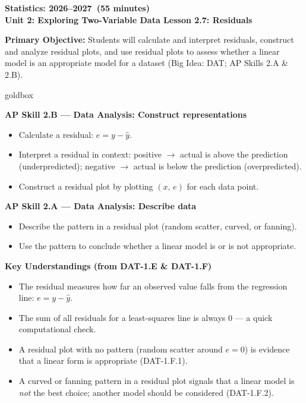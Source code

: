 \documentclass[10pt]{article}
\newcommand{\CourseName}{Statistics}
\newcommand{\SchoolYear}{2026--2027}
\newcommand{\MeetingLength}{55 minutes}
\newcommand{\UnitNumberName}{Unit 2: Exploring Two-Variable Data \quad}
\newcommand{\LessonNumberName}{Lesson 2.7: Residuals}
\begin{document}
\begin{center}
    {\Large\bfseries \CourseName: \SchoolYear\ (\MeetingLength) \\
    {\small\bfseries \UnitNumberName \LessonNumberName}}
\end{center}

\begin{tcolorbox}[colback=sky,colframe=navy,boxrule=0.9pt,arc=2mm,
    left=2mm,right=2mm,top=1.5mm,bottom=1.5mm]
    \textbf{Primary Objective:} Students will calculate and interpret residuals, construct and
    analyze residual plots, and use residual plots to assess whether a linear model is an
    appropriate model for a dataset (Big Idea: DAT; AP Skills 2.A \& 2.B).
\end{tcolorbox}

\begin{skillbox}{goldbox}
\begin{minipage}[t]{0.48\linewidth}
    \textbf{AP Skill 2.B --- Data Analysis: Construct representations}
    \begin{itemize}
        \item Calculate a residual: $e = y - \hat{y}$.
        \item Interpret a residual in context: positive $\to$ actual is above the prediction
              (underpredicted); negative $\to$ actual is below the prediction (overpredicted).
        \item Construct a residual plot by plotting $(x,\, e)$ for each data point.
    \end{itemize}
    \textbf{AP Skill 2.A --- Data Analysis: Describe data}
    \begin{itemize}
        \item Describe the pattern in a residual plot (random scatter, curved, or fanning).
        \item Use the pattern to conclude whether a linear model is or is not appropriate.
    \end{itemize}
\end{minipage}
\hfill
\begin{minipage}[t]{0.48\linewidth}
    \textbf{Key Understandings (from DAT-1.E \& DAT-1.F)}
    \begin{itemize}
        \item The residual measures how far an observed value falls from the regression line:
              $e = y - \hat{y}$.
        \item The sum of all residuals for a least-squares line is always 0 --- a quick
              computational check.
        \item A residual plot with no pattern (random scatter around $e = 0$) is evidence
              that a linear form is appropriate (DAT-1.F.1).
        \item A curved or fanning pattern in a residual plot signals that a linear model is
              \textit{not} the best choice; another model should be considered (DAT-1.F.2).
    \end{itemize}
\end{minipage}
\end{skillbox}
\end{document}
